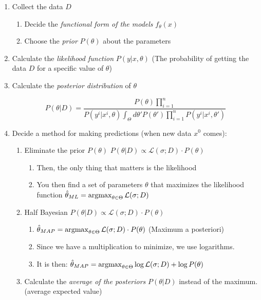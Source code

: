 \begin{enumerate}
	\item
	      Collect the data \(D\)

	      \begin{enumerate}
		      \item
		            Decide the \emph{functional form of the models} \(f_\theta (x)\)
		      \item
		            Choose the \emph{prior} \(P(\theta)\) about the parameters
	      \end{enumerate}
	\item
	      Calculate the \emph{likelihood function} \(P(y | x, \theta)\) (The
	      probability of getting the data \(D\) for a specific value of
	      \(\theta\))
	\item
	      Calculate the \emph{posterior distribution} of \(\theta\)

	      \[
		      P(\theta | D) = \frac{P(\theta) \prod_{i=1}^n}{P(y^i|x^i, \theta)
			      {\int_\Theta d\theta' P(\theta')\prod_{i=1}^n} P(y^i|x^i, \theta')}
	      \]

	\item
	      Decide a method for making predictions (when new data \(x^0\) comes):

	      \begin{enumerate}
		      \item Eliminate the prior \(P(\theta)\) \textrightarrow{}
		            \(P(\theta | D) \propto \mathcal{L}(\sigma ; D) \cdot P(\theta)\)

		            \begin{enumerate}
			            \item
			                  Then, the only thing that matters is the likelihood
			            \item
			                  You then find a set of parameters \(\theta\) that maximizes the
			                  likelihood function
			                  \(\hat{\theta}_{ML} = \operatorname{argmax}_{\theta \in \Theta} \mathcal{L}(\sigma ; D)\)
		            \end{enumerate}
		      \item
		            Half Bayesian
		            \(P(\theta | D) \propto \mathcal{L}(\sigma ; D) \cdot P(\theta)\)

		            \begin{enumerate}
			            \item
			                  \(\hat{\theta}_{MAP} = \operatorname{argmax}_{\theta \in \Theta} \mathcal{L}(\sigma ; D) \cdot P(\theta)\)
			                  (Maximum a posteriori)
			            \item
			                  Since we have a multiplication to minimize, we use logarithms.
			            \item
			                  It is then:
			                  \(\hat{\theta}_{MAP} = \operatorname{argmax}_{\theta \in \Theta} \log \mathcal{L}(\sigma ; D) + \log P(\theta)\)
		            \end{enumerate}
		      \item
		            Calculate the \emph{average of the posteriors} \(P(\theta | D)\)
                instead of the maximum. (average \textrightarrow{} expected value)


\end{enumerate}
\end{enumerate}
